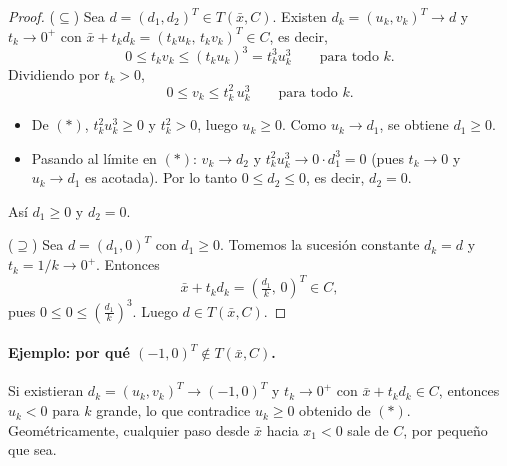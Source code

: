 \documentclass[11pt]{article}
\begin{document}
\begin{proof}
($\subseteq$) Sea $d=(d_1,d_2)^T\in T(\bar x,C)$. Existen $d_k=(u_k,v_k)^T\to d$ y $t_k\to 0^+$ con $\bar x+t_kd_k=(t_ku_k,\,t_kv_k)^T\in C$, es decir,
\[
0\le t_kv_k\le (t_ku_k)^3=t_k^3u_k^3\qquad\text{para todo }k.
\]
Dividiendo por $t_k>0$,
\[
0\le v_k\le t_k^2\,u_k^3\qquad\text{para todo }k. \tag{$\ast$}
\]
\begin{itemize}
  \item De $(\ast)$, $t_k^2u_k^3\ge 0$ y $t_k^2>0$, luego $u_k\ge 0$. Como $u_k\to d_1$, se obtiene $d_1\ge 0$.
  \item Pasando al límite en $(\ast)$: $v_k\to d_2$ y $t_k^2u_k^3\to 0\cdot d_1^3=0$ (pues $t_k\to 0$ y $u_k\to d_1$ es acotada). Por lo tanto $0\le d_2\le 0$, es decir, $d_2=0$.
\end{itemize}
Así $d_1\ge 0$ y $d_2=0$.

($\supseteq$) Sea $d=(d_1,0)^T$ con $d_1\ge 0$. Tomemos la sucesión constante $d_k=d$ y $t_k=1/k\to 0^+$. Entonces
\[
\bar x+t_kd_k=\left(\tfrac{d_1}{k},\,0\right)^T\in C,
\]
pues $0\le 0\le \left(\tfrac{d_1}{k}\right)^3$. Luego $d\in T(\bar x,C)$.
\end{proof}

\paragraph{Ejemplo: por qué $(-1,0)^T\notin T(\bar x,C)$.} Si existieran $d_k=(u_k,v_k)^T\to(-1,0)^T$ y $t_k\to 0^+$ con $\bar x+t_kd_k\in C$, entonces $u_k<0$ para $k$ grande, lo que contradice $u_k\ge 0$ obtenido de $(\ast)$. Geométricamente, cualquier paso desde $\bar x$ hacia $x_1<0$ sale de $C$, por pequeño que sea.
\end{document}
